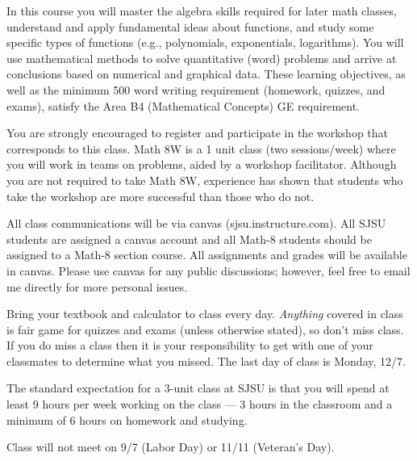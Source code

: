 \documentclass[letterpaper, 12pt]{article}
\begin{document}
\begin{description}
\setlength{\itemsep}{0in}

\item[Learning Objectives.] In this course you will master the algebra skills
  required for later math classes, understand and apply fundamental ideas about
  functions, and study some specific types of functions (e.g., polynomials,
  exponentials, logarithms).  You will use mathematical methods to solve
  quantitative (word) problems and arrive at conclusions based on numerical and
  graphical data.  These learning objectives, as well as the minimum 500 word
  writing requirement (homework, quizzes, and exams), satisfy the Area B4
  (Mathematical Concepts) GE requirement.

\item[Math 8W.] You are strongly encouraged to register and participate in the
  workshop that corresponds to this class.  Math 8W is a 1 unit class (two
  sessions/week) where you will work in teams on problems, aided by a workshop
  facilitator.  Although you are not required to take Math 8W, experience has
  shown that students who take the workshop are more successful than those who
  do not.

\item[Canvas.] All class communications will be via canvas
  (sjsu.instructure.com). All SJSU students are assigned a canvas account and
  all Math-8 students should be assigned to a Math-8 section course.  All
  assignments and grades will be available in canvas. Please use canvas for any
  public discussions; however, feel free to email me directly for more personal
  issues.

\item[Class.] Bring your textbook and calculator to class every day.
  \emph{Anything} covered in class is fair game for quizzes and exams (unless
  otherwise stated), so don't miss class.  If you do miss a class then it is
  your responsibility to get with one of your classmates to determine what you
  missed.  The last day of class is Monday, 12/7.

\item[Time Expectations.] The standard expectation for a 3-unit class at SJSU
  is that you will spend at least 9 hours per week working on the class --- 3
  hours in the classroom and a minimum of 6 hours on homework and studying.

\item[Holidays.] Class will not meet on 9/7 (Labor Day) or 11/11
  (Veteran's Day).


\end{description}
\end{document}
